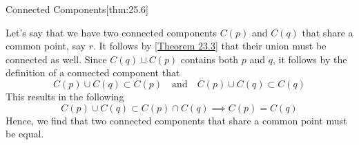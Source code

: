 \begin{thmBox}{Connected Components}[thm:25.6]
\begin{proofBox}
        \baseSkip

        Let's say that we have two connected components \( C ( p ) \) and 
        \( C ( q ) \) that share a common point, say \( r \).
        It follows by [\hyperlink{thm:23.3}{Theorem 23.3}] that their union
        must be connected as well.
        Since \( C ( q ) \cup C ( p ) \) contains both \( p \) and \( q \), 
        it follows by the definition of a connected component that 
        \begin{equation*}
            C ( p ) \cup C ( q )
            \subset
            C ( p )
            \quad \mathrm{and} \quad 
            C ( p ) \cup C ( q )
            \subset
            C ( q )
        \end{equation*}
        This results in the following
        \begin{equation*}
            C ( p ) \cup C ( q )
            \subset 
            C ( p ) \cap C ( q )
            \implies 
            C ( p ) = C ( q )
        \end{equation*}
        Hence, we find that two connected components that share a common point
        must be equal.
    \end{proofBox}
\end{thmBox}


